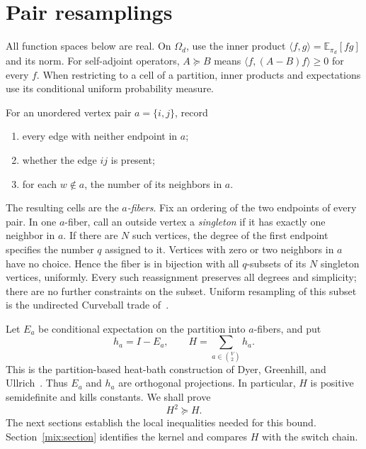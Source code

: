 \section{Pair resamplings}
\label{sec:setup}
All function spaces below are real. On $\Omega_d$, use the inner
product $\langle f,g\rangle=\mathbb E_{\pi_d}[fg]$ and its norm.
For self-adjoint operators, $A\succeq B$ means
$\langle f,(A-B)f\rangle\ge0$ for every $f$.
When restricting to a cell of a partition, inner products and
expectations use its conditional uniform probability measure.

For an unordered vertex pair $a=\{i,j\}$, record
\begin{enumerate}
\item every edge with neither endpoint in $a$;
\item whether the edge $ij$ is present;
\item for each $w\notin a$, the number of its neighbors in $a$.
\end{enumerate}
The resulting cells are the \emph{$a$-fibers}. Fix an ordering of the
two endpoints of every pair. In one $a$-fiber, call an outside vertex
a \emph{singleton} if it has exactly one neighbor in $a$.
If there are $N$ such vertices, the degree of the first endpoint
specifies the number $q$ assigned to it. Vertices with zero or two
neighbors in $a$ have no choice. Hence the fiber is in bijection
with all $q$-subsets of its $N$ singleton vertices, uniformly.
Every such reassignment preserves all degrees and simplicity;
there are no further constraints on the subset.
Uniform resampling of this subset is the undirected Curveball
trade of~\cite{CBS18}.

Let $E_a$ be conditional expectation on the partition into
$a$-fibers, and put
\begin{equation}\label{eq:pair-operators}
 h_a=I-E_a,\qquad H=\sum_{a\in\binom V2}h_a.
\end{equation}
This is the partition-based heat-bath construction of
Dyer, Greenhill, and Ullrich~\cite[Definition~1.1]{DGU14}.
Thus $E_a$ and $h_a$ are orthogonal projections. In particular,
$H$ is positive semidefinite and kills constants. We shall prove
\begin{equation}\label{eq:H-target}
 H^2\succeq H.
\end{equation}
The next sections establish the local inequalities needed for this
bound. Section~\ref{mix:section} identifies the kernel and compares $H$
with the switch chain.
